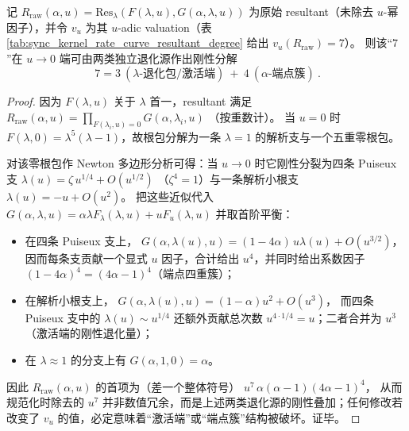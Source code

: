 \begin{proposition}[\texorpdfstring{$v_u(R_{\mathrm{raw}})=7$}{vu=7} 的刚性分解：\texorpdfstring{$7=3+4$}{7=3+4}]\label{prop:rate-resultant-uadic-split-7}
记 \(R_{\mathrm{raw}}(\alpha,u)=\mathrm{Res}_\lambda(F(\lambda,u),G(\alpha,\lambda,u))\) 为原始 resultant（未除去 \(u\)-幂因子），并令 \(v_u\) 为其 \(u\)-adic valuation（表 \ref{tab:sync_kernel_rate_curve_resultant_degree} 给出 \(v_u(R_{\mathrm{raw}})=7\)）。
则该“\(7\)”在 \(u\to 0\) 端可由两类独立退化源作出刚性分解
\[
\boxed{\ 7=3\ (\lambda\text{-退化包/激活端})\ +\ 4\ (\alpha\text{-端点簇})\ }.
\]
\begin{proof}
因为 \(F(\lambda,u)\) 关于 \(\lambda\) 首一，resultant 满足
\(
R_{\mathrm{raw}}(\alpha,u)=\prod_{F(\lambda_i,u)=0}G(\alpha,\lambda_i,u)
\)
（按重数计）。
当 \(u=0\) 时 \(F(\lambda,0)=\lambda^5(\lambda-1)\)，故根包分解为一条 \(\lambda=1\) 的解析支与一个五重零根包。
\par
\noindent 对该零根包作 Newton 多边形分析可得：当 \(u\to0\) 时它刚性分裂为四条 Puiseux 支
\(
\lambda(u)=\zeta\,u^{1/4}+O(u^{1/2})
\)
（\(\zeta^4=1\)）与一条解析小根支
\(
\lambda(u)=-u+O(u^2)
\)。
把这些近似代入
\(
G(\alpha,\lambda,u)=\alpha\lambda F_\lambda(\lambda,u)+uF_u(\lambda,u)
\)
并取首阶平衡：
\begin{itemize}
  \item 在四条 Puiseux 支上，
  \(
  G(\alpha,\lambda(u),u)=(1-4\alpha)\,u\lambda(u)+O(u^{3/2})
  \)，
  因而每条支贡献一个显式 \(u\) 因子，合计给出 \(u^4\)，并同时给出系数因子 \((1-4\alpha)^4=(4\alpha-1)^4\)（端点四重簇）；
  \item 在解析小根支上，
  \(
  G(\alpha,\lambda(u),u)=(1-\alpha)u^2+O(u^3)
  \)，
  而四条 Puiseux 支中的 \(\lambda(u)\sim u^{1/4}\) 还额外贡献总次数 \(u^{4\cdot 1/4}=u\)；二者合并为 \(u^3\)（激活端的刚性退化量）；
  \item 在 \(\lambda\approx 1\) 的分支上有 \(G(\alpha,1,0)=\alpha\)。
\end{itemize}
因此 \(R_{\mathrm{raw}}(\alpha,u)\) 的首项为（差一个整体符号）
\(
u^7\,\alpha(\alpha-1)(4\alpha-1)^4
\)，
从而规范化时除去的 \(u^7\) 并非数值冗余，而是上述两类退化源的刚性叠加；任何修改若改变了 \(v_u\) 的值，必定意味着“激活端”或“端点簇”结构被破坏。证毕。
\end{proof}
\end{proposition}





